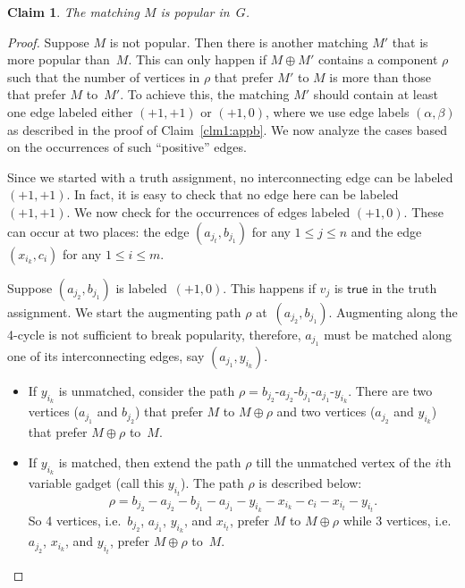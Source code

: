 \documentclass[11pt]{llncs}
\newtheorem{new-claim}{Claim}
\begin{document}
\begin{new-claim}
\label{clm2:appb}
The matching $M$ is popular in~$G$.
\end{new-claim}
\begin{proof}
Suppose $M$ is not popular. Then there is another matching $M'$ that is more popular than~$M$. This can only happen if $M \oplus M'$ contains 
a component $\rho$ such that the number of vertices in $\rho$ that prefer $M'$ to $M$ is more than those that prefer $M$ to~$M'$.
To achieve this, the matching $M'$ should contain at least one edge labeled either $(+1,+1)$ or $(+1,0)$, where we use edge labels $(\alpha,\beta)$
as described in the proof of Claim~\ref{clm1:appb}. We now analyze the cases based on the occurrences of such ``positive'' edges.

Since we started with a truth assignment, no interconnecting edge can be labeled $(+1,+1)$. In fact, it is easy to check that no edge here can 
be labeled $(+1,+1)$. We now check for the occurrences of edges labeled $(+1,0)$. These can occur at two places: the edge $(a_{j_t}, b_{j_1})$ 
for any $1 \le j \le n$ and the edge $(x_{i_k},c_i)$ for any $1 \le i \le m$. 

 Suppose $(a_{j_2}, b_{j_1})$ is labeled~$(+1,0)$. This happens if $v_j$ is $\mathsf{true}$ in the truth assignment.
We start the augmenting path $\rho$ at~$(a_{j_2}, b_{j_1})$. Augmenting along the 4-cycle is not sufficient to break popularity, therefore, $a_{j_1}$ must 
be matched along one of its interconnecting edges, say $(a_{j_1},y_{i_k})$. 
\begin{itemize}
\item If $y_{i_k}$ is unmatched, consider the path $\rho = b_{j_2}$-$a_{j_2}$-$b_{j_1}$-$a_{j_1}$-$y_{i_k}$. There are two vertices ($a_{j_1}$ and $b_{j_2}$) 
that prefer $M$ to $M \oplus \rho$ and two vertices ($a_{j_2}$ and $y_{i_k}$) that prefer $M \oplus \rho$ to~$M$.
\item If $y_{i_k}$ is matched, then extend the path $\rho$ till the unmatched vertex of the $i$th variable gadget (call this $y_{i_t}$). The path
$\rho$ is described below:
\[ \rho = b_{j_2} - a_{j_2} - b_{j_1} - a_{j_1} - y_{i_k} - x_{i_k} - c_i - x_{i_t} - y_{i_t}.\]
So 4 vertices, i.e.\ $b_{j_2}$, $a_{j_1}$, $y_{i_k}$, and $x_{i_t}$, prefer
$M$ to $M \oplus \rho$ while 3 vertices, i.e.\ $a_{j_2}$, $x_{i_k}$, and $y_{i_t}$, prefer $M \oplus \rho$ to~$M$.
\end{itemize}




\end{proof}
\end{document}
